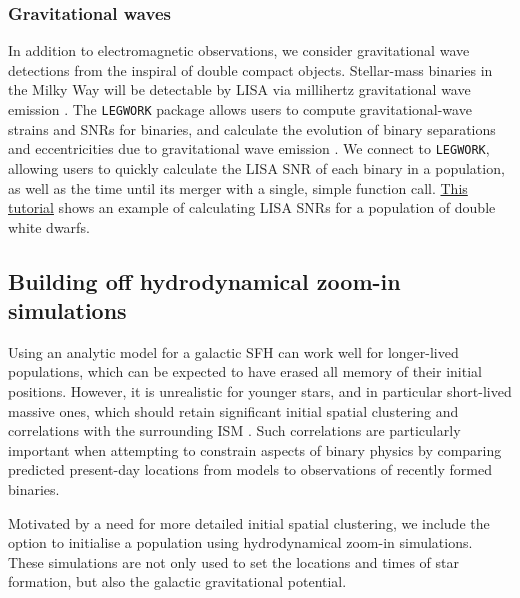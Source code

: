 \documentclass[twocolumn, twocolappendix, oneside]{aastex631}
\newcommand{\tutorialLink}[2]{\href{#1}{{\color{codecolour}#2}}}
\begin{document}
\subsubsection{Gravitational waves}

In addition to electromagnetic observations, we consider gravitational wave detections from the inspiral of double compact objects. Stellar-mass binaries in the Milky Way will be detectable by LISA via millihertz gravitational wave emission \citep{Amaro-Seoane+2017:2017arXiv170200786A}. The \texttt{LEGWORK} package allows users to compute gravitational-wave strains and SNRs for binaries, and calculate the evolution of binary separations and eccentricities due to gravitational wave emission \citep{LEGWORK_joss, LEGWORK_apjs}. We connect \cogsworth to \texttt{LEGWORK}, allowing users to quickly calculate the LISA SNR of each binary in a population, as well as the time until its merger with a single, simple function call. \tutorialLink{https://cogsworth.readthedocs.io/en/latest/tutorials/misc/lisa.html}{This tutorial} shows an example of calculating LISA SNRs for a \cogsworth population of double white dwarfs.

\subsection{Building off hydrodynamical zoom-in simulations}\label{sec:hydro_linking}

Using an analytic model for a galactic SFH can work well for longer-lived populations, which can be expected to have erased all memory of their initial positions. However, it is unrealistic for younger stars, and in particular short-lived massive ones, which should retain significant initial spatial clustering and correlations with the surrounding ISM \citep[e.g.,][]{Sarbadhicary+2023:2023arXiv231017694S}. Such correlations are particularly important when attempting to constrain aspects of binary physics by comparing predicted present-day locations from \cogsworth models to observations of recently formed binaries.%

Motivated by a need for more detailed initial spatial clustering, we include the option to initialise a \cogsworth population using hydrodynamical zoom-in simulations. These simulations are not only used to set the locations and times of star formation, but also the galactic gravitational potential. 
\end{document}

